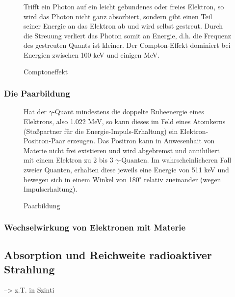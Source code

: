 \begin{figure}[H]
	\begin{minipage}{0.4\textwidth}
	Trifft ein Photon auf ein leicht gebundenes oder freies Elektron, so wird das Photon nicht ganz absorbiert, sondern gibt einen Teil seiner Energie an das Elektron ab und wird selbst gestreut. Durch die Streuung verliert das Photon somit an Energie, d.h. die Frequenz des gestreuten Quants ist kleiner. Der Compton-Effekt dominiert bei Energien zwischen 100 keV und einigen MeV.
	\end{minipage}
	\begin{minipage}{0.59\textwidth}
	\centering %
	\caption{Comptoneffekt}
	\end{minipage}

\end{figure}

\subsubsection{Die Paarbildung}

\begin{figure}[H]
	\begin{minipage}{0.49\textwidth}
	\centering %
	\caption{Paarbildung}
	\end{minipage}
	\begin{minipage}{0.5\textwidth}
	Hat der $\gamma$-Quant mindestens die doppelte Ruheenergie eines Elektrons, also 1.022 MeV, so kann dieses im Feld eines Atomkerns (Stoßpartner für die Energie-Impuls-Erhaltung) ein Elektron-Positron-Paar erzeugen. Das Positron kann in Anwesenhait von Materie nicht frei existieren und wird abgebremst und annihiliert mit einem Elektron zu 2 bis 3 $\gamma$-Quanten. Im wahrscheinlicheren Fall zweier Quanten, erhalten diese jeweils eine Energie von 511 keV und bewegen sich in einem Winkel von 180$^\circ$ relativ zueinander (wegen Impulserhaltung).
	\end{minipage}
\end{figure}

\subsubsection{Wechselwirkung von Elektronen mit Materie}

\subsection{Absorption und Reichweite radioaktiver Strahlung}
 --> z.T. in Szinti

